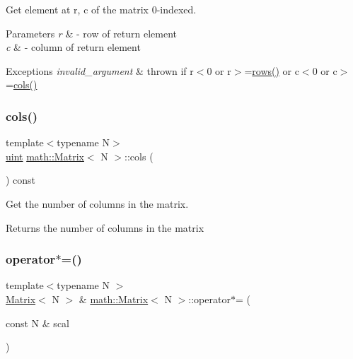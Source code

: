 Get element at r, c of the matrix 0-\/indexed. 
\begin{DoxyParams}{Parameters}
{\em r} & -\/ row of return element \\
\hline
{\em c} & -\/ column of return element \\
\hline
\end{DoxyParams}

\begin{DoxyExceptions}{Exceptions}
{\em invalid\+\_\+argument} & thrown if r$<$0 or r$>$=\hyperlink{classmath_1_1Matrix_a602173645d806afe305ed77b1ff38273}{rows()} or c$<$0 or c$>$=\hyperlink{classmath_1_1Matrix_ad78b49e12a607856df124a18a855aaf1}{cols()} \\
\hline
\end{DoxyExceptions}
\mbox{\label{classmath_1_1Matrix_ad78b49e12a607856df124a18a855aaf1}} 
\subsubsection{\texorpdfstring{cols()}{cols()}}
{\footnotesize\ttfamily template$<$typename N$>$ \\
\hyperlink{typedefs_8h_a7b9b9413622e67b9df7f2d090b48682b}{uint} \hyperlink{classmath_1_1Matrix}{math\+::\+Matrix}$<$ N $>$\+::cols (\begin{DoxyParamCaption}{ }\end{DoxyParamCaption}) const\hspace{0.3cm}{\ttfamily [inline]}}

Get the number of columns in the matrix. \begin{DoxyReturn}{Returns}
the number of columns in the matrix 
\end{DoxyReturn}
\mbox{\label{classmath_1_1Matrix_a1704c2b9fd200a6854b6793524a15700}} 
\subsubsection{\texorpdfstring{operator$\ast$=()}{operator*=()}\hspace{0.1cm}{\footnotesize\ttfamily [1/2]}}
{\footnotesize\ttfamily template$<$typename N $>$ \\
\hyperlink{classmath_1_1Matrix}{Matrix}$<$ N $>$ \& \hyperlink{classmath_1_1Matrix}{math\+::\+Matrix}$<$ N $>$\+::operator$\ast$= (\begin{DoxyParamCaption}\item[{const N \&}]{scal }\end{DoxyParamCaption})}


